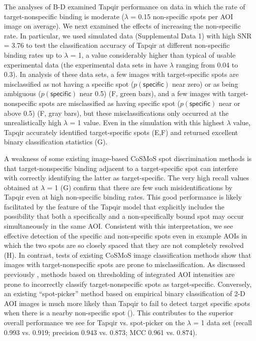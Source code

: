 The analyses of B-D examined Tapqir performance on data in which the rate of target-nonspecific binding is moderate ($\lambda$ = 0.15 non-specific spots per AOI image on average).  We next examined the effects of increasing the non-specific rate.  In particular, we used simulated data (Supplemental Data 1) with high SNR = 3.76 to test the classification accuracy of Tapqir at different non-specific binding rates up to $\lambda$ = 1, a value considerably higher than typical of usable experimental data (the experimental data sets in  have $\lambda$ ranging from 0.04 to 0.3).   In analysis of these data sets, a few images with target-specific spots are misclassified as not having a specific spot ($p(\mathsf{specific})$ near zero) or as being ambiguous ($p(\mathsf{specific})$ near 0.5) (F, green bars), and a few images with target-nonspecific spots are misclassified as having specific spot ($p(\mathsf{specific})$ near or above 0.5) (F, gray bars), but these misclassifications only occurred at the unrealistically high $\lambda$ = 1 value.  Even in the simulation with this highest $\lambda$ value, Tapqir accurately identified target-specific spots (E,F) and returned excellent binary classification statistics (G). 

A weakness of some existing image-based CoSMoS spot discrimination methods is that target-nonspecific binding adjacent to a target-specific spot can interfere with correctly identifying the latter as target-specific.  The very high recall values obtained at $\lambda$ = 1 (G) confirm that there are few such misidentifications by Tapqir even at high non-specific binding rates.  This good performance is likely facilitated by the feature of the Tapqir model that explicitly includes the possibility that both a specifically and a non-specifically bound spot may occur simultaneously in the same AOI. Consistent with this interpretation, we see effective detection of the specific and non-specific spots even in example AOIs in which the two spots are so closely spaced that they are not completely resolved (H). In contrast, tests of existing CoSMoS image classification methods show that images with target-nonspecific spots are prone to misclassification.  As discussed previously \citep{Friedman2015-nx}, methods based on thresholding of integrated AOI intensities are prone to incorrectly classify target-nonspecific spots as target-specific.  Conversely, an existing ``spot-picker'' method based on empirical binary classification of 2-D AOI images \citep{Friedman2015-nx} is much more likely than Tapqir to fail to detect target specific spots when there is a nearby non-specific spot   ().  This contributes to the superior overall performance we see for Tapqir vs. spot-picker on the $\lambda$ = 1 data set (recall 0.993 vs. 0.919; precision 0.943 vs. 0.873; MCC 0.961 vs. 0.874).

